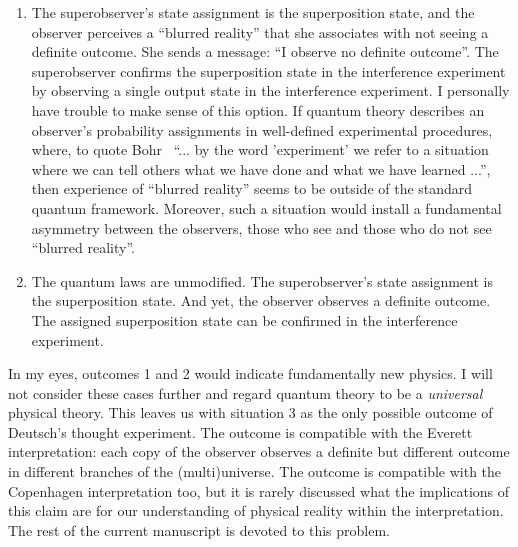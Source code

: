 \documentclass[12pt,a4]{article}
\begin{document}
\begin{enumerate}
\item The superobserver's state assignment is the superposition state, and the observer perceives a ``blurred reality'' that she associates with not seeing a definite outcome. She sends a message: ``I observe no definite outcome''. The superobserver confirms the superposition state in the interference experiment by observing a single output state in the interference experiment. I personally have trouble to make sense of this option. If quantum theory describes an  observer's probability assignments in well-defined experimental procedures, where, to quote Bohr~\cite{bohr2} ``... by the word 'experiment' we refer to a situation where we can tell others what we have done and what we have learned ...'', then experience of ``blurred reality'' seems to be outside of the standard quantum framework. Moreover, such a situation would install a fundamental asymmetry between the observers, those who see and those who do not see ``blurred reality''.

\item The quantum laws are unmodified. The superobserver's state assignment is the superposition state. And yet, the observer observes a definite outcome. The assigned superposition state can be confirmed in the interference experiment. 

\end{enumerate}

In my eyes, outcomes 1 and 2 would indicate fundamentally new physics. I will not consider these cases further and regard quantum theory to be a {\it universal} physical theory. This leaves us with situation 3 as the only possible outcome of Deutsch's thought experiment. The outcome is compatible with the Everett interpretation: each copy of the observer observes a definite but different outcome in different branches of the (multi)universe. The outcome is compatible with the Copenhagen interpretation too, but it is rarely discussed what the implications of this claim are for our understanding of physical reality within the interpretation. The rest of the current manuscript is devoted to this problem.   
\end{document}
